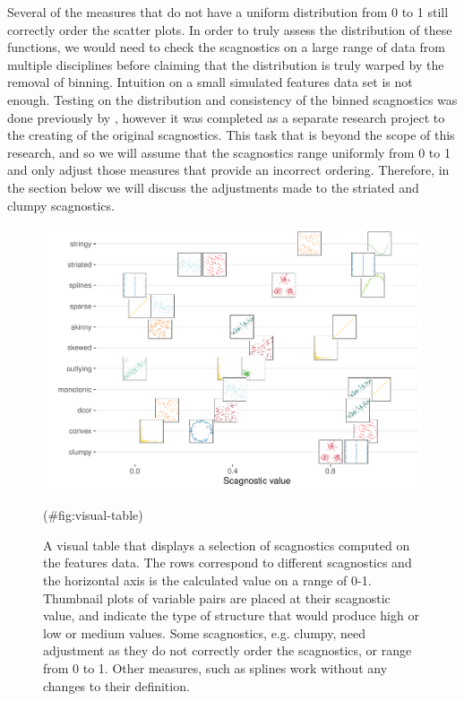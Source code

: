 Several of the measures that do not have a uniform distribution from 0
to 1 still correctly order the scatter plots. In order to truly assess
the distribution of these functions, we would need to check the
scagnostics on a large range of data from multiple disciplines before
claiming that the distribution is truly warped by the removal of
binning. Intuition on a small simulated features data set is not enough.
Testing on the distribution and consistency of the binned scagnostics
was done previously by \citet{scagdist}, however it was completed as a
separate research project to the creating of the original scagnostics.
This task that is beyond the scope of this research, and so we will
assume that the scagnostics range uniformly from 0 to 1 and only adjust
those measures that provide an incorrect ordering. Therefore, in the
section below we will discuss the adjustments made to the striated and
clumpy scagnostics.

\begin{Schunk}
\begin{figure}
\includegraphics[width=1\linewidth]{mason-lee-laa-cook_files/figure-latex/visual-table-1} \caption[A visual table that displays a selection of scagnostics computed on the features data]{A visual table that displays a selection of scagnostics computed on the features data. The rows correspond to different scagnostics and the horizontal axis is the calculated value on a range of 0-1. Thumbnail plots of variable pairs are placed at their scagnostic value, and indicate the type of structure that would produce high or low or medium values. Some scagnostics, e.g. clumpy, need adjustment as they do not correctly order the scagnostics, or range from 0 to 1. Other measures, such as splines work without any changes to their definition.}(\#fig:visual-table)
\end{figure}
\end{Schunk}

